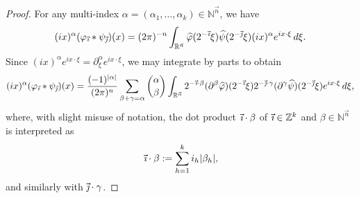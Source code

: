 \documentclass[11pt, reqno]{amsart}
\theoremstyle{definition}
\theoremstyle{remark}
\numberwithin{equation}{section}
\newcommand{\N}{\mathbb N}
\newcommand{\R}{\mathbb R}
\newcommand{\Z}{\mathbb Z}
\newcommand{\vi}{\vec{\textit{\i}}}
\newcommand{\vj}{\vec{\textit{\j}}}
\newcommand{\vn}{\vec n}
\newcommand{\abs}[1]{|#1|}
\begin{document}
\begin{proof}
For any multi-index $\alpha=(\alpha_1,\ldots,\alpha_k)\in\N^{\vn}$, we have
\begin{equation*}
(ix)^\alpha(\varphi_{\vi}*\psi_{\vj})(x)
=(2\pi)^{-n}\int_{\R^{\vn}}\widehat\varphi(2^{-\vi}\xi)
\widehat\psi(2^{-\vj}\xi)(ix)^\alpha e^{i x\cdot\xi} \, d\xi.
\end{equation*}
Since $(ix)^\alpha e^{ix\cdot\xi}=\partial_\xi^\alpha e^{ix\cdot\xi}$, we may integrate by parts to obtain
\begin{equation*}
(ix)^\alpha(\varphi_{\vi}*\psi_{\vj})(x)
=\frac{(-1)^{\abs{\alpha}}}{(2\pi)^{n}}\sum_{\beta+\gamma=\alpha}\binom{\alpha}{\beta}\int_{\R^{\vn}}
2^{-\vi\cdot\beta}(\partial^\beta\widehat\varphi)(2^{-\vi}\xi)
2^{-\vj\cdot\gamma}(\partial^\gamma\widehat\psi)(2^{-\vj}\xi)
e^{i x\cdot\xi} \, d\xi,
\end{equation*}
where, with slight misuse of notation, the dot product  $\vi\cdot\beta$ of $\vi\in\Z^k$ and $\beta\in\N^{\vn}$ is interpreted as
\begin{equation*}
\vi\cdot\beta:=\sum_{h=1}^k i_h\abs{\beta_h},
\end{equation*}
and similarly with $\vj\cdot\gamma$.


\end{proof}
\end{document}
